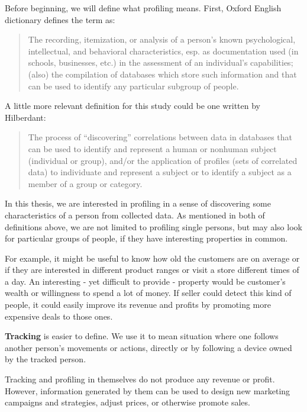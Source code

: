 \documentclass[12pt,a4paper,oneside,pdftex]{report}
\begin{document}
Before beginning, we will define what profiling means. First, Oxford English dictionary defines the term as:~\cite{oed_profiling}

\begin{quote}
The recording, itemization, or analysis of a person's known psychological, intellectual, and behavioral characteristics, esp. as documentation used (in schools, businesses, etc.) in the assessment of an individual's capabilities; (also) the compilation of databases which store such information and that can be used to identify any particular subgroup of people.
\end{quote}

A little more relevant definition for this study could be one written by Hilberdant:~\cite{hildebrandt2008}

\begin{quote}
The process of ``discovering'' correlations between data in databases that can be used to identify and represent a human or nonhuman subject (individual or group), and/or the application of profiles (sets of correlated data) to individuate and represent a subject or to identify a subject as a member of a group or category.
\end{quote}

In this thesis, we are interested in profiling in a sense of discovering some characteristics of a person from collected data. As mentioned in both of definitions above, we are not limited to profiling single persons, but may also look for particular groups of people, if they have interesting properties in common.

For example, it might be useful to know how old the customers are on average or if they are interested in different product ranges or visit a store different times of a day. An interesting - yet difficult to provide - property would be customer's wealth or willingness to spend a lot of money. If seller could detect this kind of people, it could easily improve its revenue and profits by promoting more expensive deals to those ones.

\textbf{Tracking} is easier to define. We use it to mean situation where one follows another person's movements or actions, directly or by following a device owned by the tracked person. 

Tracking and profiling in themselves do not produce any revenue or profit. However, information generated by them can be used to design new marketing campaigns and strategies, adjust prices, or otherwise promote sales.
\end{document}
